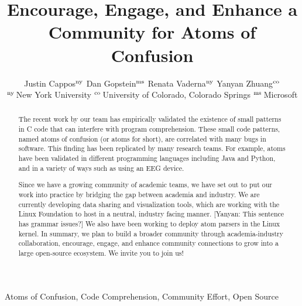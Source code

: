 \documentclass[conference]{IEEEtran}
\begin{document}
\newif\ifrev
\revtrue
\ifrev
  \newcommand{\yanyan}[1]{{\color{blue} [Yanyan: #1]}}
  \newcommand{\red}[1]{\textcolor{red}{#1}}
  \newcommand{\todo}[1]{\textcolor{red}{\textbf{Anyone todo}: #1}}
\else
  \newcommand{\yanyan}[1]{}
  \newcommand{\red}[1]{}
  \newcommand{\todo}[1]{}
\fi

\title{Encourage, Engage, and
Enhance a Community for Atoms of Confusion}

\author{Justin Cappos${}^{\rm ny}$ \qquad Dan Gopstein${}^{\rm ms}$ \qquad Renata Vaderna${}^{\rm ny}$ \qquad Yanyan Zhuang${}^{\rm co}$\\
${}^{\rm ny}$\,New York University \quad 
${}^{\rm co}$\,University of Colorado, Colorado Springs \quad  ${}^{\rm ms}$\,Microsoft %
}

\maketitle

\begin{abstract}
The recent work by our team has empirically 
validated the existence of small patterns in C code
that can interfere with program comprehension.
These small code patterns, named atoms of confusion 
(or atoms for short), are correlated with many bugs in software. This finding has been replicated by many 
research teams. For example, atoms have been validated 
in different programming languages including Java and 
Python, and in a variety of ways such as using an EEG device.

Since we have a growing community of academic teams, 
we have set out to put our work into practice by 
bridging the gap between academia and industry.  We 
are currently developing data 
sharing and visualization tools, which are working with the Linux Foundation 
to host in a neutral, industry facing manner. \yanyan{This sentence has grammar issues?}  We 
also have been working to deploy atom parsers in the Linux 
kernel. In summary, we plan to build a broader 
community through academia-industry collaboration,  
encourage, engage, and enhance community connections 
to grow into a large open-source ecosystem.  We invite you to join us!
\end{abstract}

\begin{IEEEkeywords}
Atoms of Confusion, Code Comprehension, Community Effort, Open Source
\end{IEEEkeywords}
\end{document}
